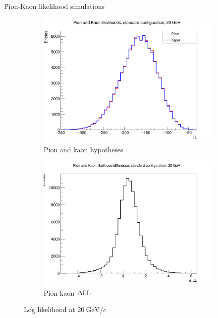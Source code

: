 \documentclass{beamer}
\begin{document}
\begin{frame}{Pion-Kaon likelihood simulations}
  \begin{figure}
    \centering
    \vspace{-0.2cm}
    \begin{subfigure}{0.5\textwidth}
      \includegraphics[width = 1.0\textwidth]{Plots/PionKaonLL20GeVStandard.png}
      \caption{Pion and kaon hypotheses}
    \end{subfigure}%
    \begin{subfigure}{0.5\textwidth}
      \includegraphics[width = 1.0\textwidth]{Plots/PionKaonDLL20GeVStandard.png}
      \caption{Pion-kaon $\Delta{\rm LL}$}
    \end{subfigure}
    \caption{Log likelihood at $\SI{20}{\giga\eV/c}$}
  \end{figure}
\end{frame}
\end{document}
